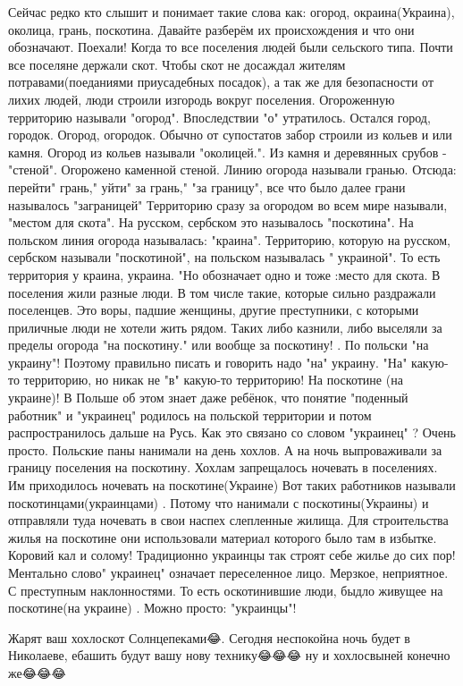 Сейчас редко кто слышит и понимает такие слова как: огород, окраина(Украина),
околица, грань, поскотина. Давайте разберём их происхождения и что они
обозначают. Поехали! Когда то все поселения людей были сельского типа. Почти
все поселяне держали скот. Чтобы скот не досаждал жителям потравами(поеданиями
приусадебных посадок), а так же для безопасности от лихих людей, люди строили
изгородь вокруг поселения. Огороженную территорию называли "огород".
Впоследствии "о" утратилось. Остался город, городок. Огород, огородок. Обычно
от супостатов забор строили из кольев и или камня. Огород из кольев называли
"околицей.". Из камня и деревянных срубов - "стеной". Огорожено каменной
стеной. Линию огорода называли гранью. Отсюда: перейти" грань," уйти" за
грань," "за границу", все что было далее грани называлось "заграницей"
Территорию сразу за огородом во всем мире называли, "местом для скота". На
русском, сербском это называлось "поскотина". На польском линия огорода
называлась: "краина". Территорию, которую на русском, сербском называли
"поскотиной", на польском называлась " украиной". То есть территория у краина,
украина. "Но обозначает одно и тоже :место для скота. В поселения жили разные
люди. В том числе такие, которые сильно раздражали поселенцев. Это воры, падшие
женщины, другие преступники, с которыми приличные люди не хотели жить рядом.
Таких либо казнили, либо выселяли за пределы огорода "на поскотину." или вообще
за поскотину! . По польски "на украину"! Поэтому правильно писать и говорить
надо "на" украину. "На" какую-то территорию, но никак не "в" какую-то
территорию! На поскотине (на украине)! В Польше об этом знает даже ребёнок, что
понятие "поденный работник" и "украинец" родилось на польской территории и
потом распространилось дальше на Русь. Как это связано со словом "украинец" ?
Очень просто. Польские паны нанимали на день хохлов. А на ночь выпроваживали за
границу поселения на поскотину. Хохлам запрещалось ночевать в поселениях. Им
приходилось ночевать на поскотине(Украине) Вот таких работников называли
поскотинцами(украинцами) . Потому что нанимали с поскотины(Украины) и
отправляли туда ночевать в свои наспех слепленные жилища. Для строительства
жилья на поскотине они использовали материал которого было там в избытке.
Коровий кал и солому! Традиционно украинцы так строят себе жилье до сих пор!
Ментально слово" украинец" означает переселенное лицо. Мерзкое, неприятное. С
преступным наклонностями. То есть оскотинившие люди, быдло живущее на
поскотине(на украине) . Можно просто: "украинцы"!

Жарят ваш хохлоскот Солнцепеками😂. Сегодня неспокойна ночь будет в Николаеве,
ебашить будут вашу нову технику😂😂😂 ну и хохлосвыней конечно же😂😂😂

